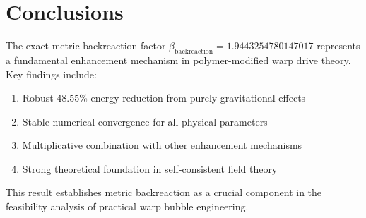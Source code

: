 \documentclass[11pt,a4paper]{article}
\begin{document}
\section{Conclusions}

The exact metric backreaction factor $\beta_{\text{backreaction}} = 1.9443254780147017$ represents a fundamental enhancement mechanism in polymer-modified warp drive theory. Key findings include:

\begin{enumerate}
\item Robust 48.55\% energy reduction from purely gravitational effects
\item Stable numerical convergence for all physical parameters  
\item Multiplicative combination with other enhancement mechanisms
\item Strong theoretical foundation in self-consistent field theory
\end{enumerate}

This result establishes metric backreaction as a crucial component in the feasibility analysis of practical warp bubble engineering.
\end{document}
